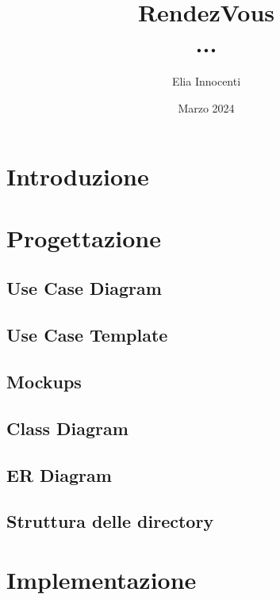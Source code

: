 \documentclass[11pt]{article}
\title{RendezVous \\
\vspace{0.5em}
\large ...}
\author{Elia Innocenti}
\date{Marzo 2024}
\begin{document}
    \maketitle

    \tableofcontents

    \newpage

    \section{Introduzione} \label{sec:introduzione}

    \section{Progettazione} \label{sec:progettazione}

        \subsection{Use Case Diagram} \label{subsec:use-case-diagram}

        \subsection{Use Case Template} \label{subsec:use-case-template}

        \subsection{Mockups} \label{subsec:mockups}

        \subsection{Class Diagram} \label{subsec:class-diagram}

        \subsection{ER Diagram} \label{subsec:er-diagram}

        \subsection{Struttura delle directory} \label{subsec:struttura-delle-directory}

    \section{Implementazione} \label{sec:implementazione}
\end{document}
